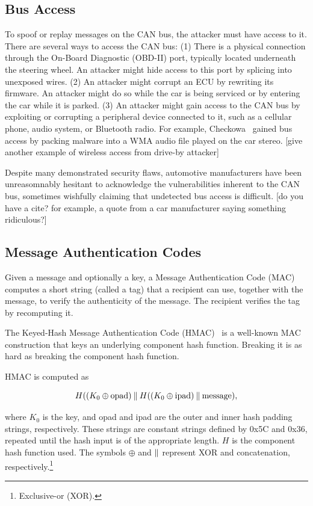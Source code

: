 \subsection{Bus Access}

To spoof or replay messages on the CAN bus, the attacker must have access to it.
There are several ways to access the CAN bus:  (1) There is a
physical connection through the On-Board Diagnostic (OBD-II) port, 
typically located underneath the steering wheel.  An attacker might hide
access to this port by splicing into unexposed wires.
(2) An attacker might corrupt an ECU by rewriting its firmware. An attacker might
do so while the car is being serviced or by entering the car while it is parked.
(3) An attacker might gain access to the CAN bus by exploiting or corrupting a peripheral
device connected to it, such as a cellular phone, audio system, or Bluetooth
radio.  For example, Checkowa~\cite{Checkoway-2011} gained bus access by packing 
malware into a WMA audio file played on the car stereo. [give another example
of wireless access from drive-by attacker]

Despite many demonstrated security flaws, automotive 
manufacturers have been unreasomnably hesitant to acknowledge the vulnerabilities inherent to the CAN bus,
sometimes wishfully claiming that undetected bus access is difficult. [do you have a cite? for example,
a quote from a car manufacturer saying something ridiculous?]

\subsection{Message Authentication Codes}

Given a message and optionally a key, a Message Authentication Code (MAC) computes a short string (called a tag) 
that a recipient can use, together with the message, to verify the authenticity of the message.  The recipient 
verifies the tag by recomputing it.

The Keyed-Hash Message Authentication Code (HMAC)~\cite{HMAC,FIPS-198-1} 
is a well-known MAC construction that keys an underlying component hash function.  
Breaking it is as hard as breaking the component hash function.

HMAC is computed as

\begin{equation}
H((K_0\oplus \text{opad})\mathbin{\|} H((K_0\oplus \text{ipad})\mathbin{\|} \text{message}) ,
\end{equation}

\noindent
where $K_0$ is the key, and opad and ipad are the outer and inner hash padding strings, respectively. 
These strings are constant strings defined by 0x5C and 0x36, repeated until the hash input is of the appropriate length. 
$H$ is the component hash function used. 
The symbols $\oplus$ and $\mathbin{\|}$ represent XOR and concatenation, respectively.\footnote{Exclusive-or (XOR).}



